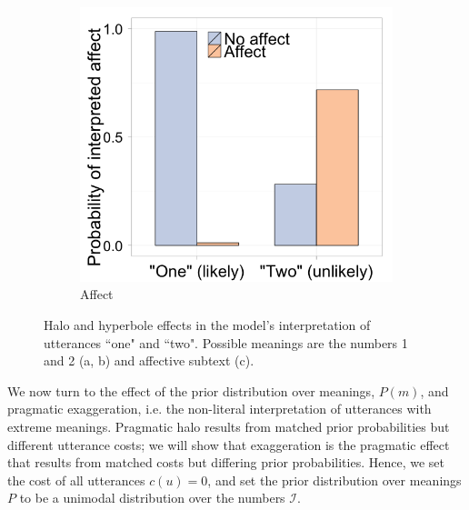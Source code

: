 \documentclass{article} %
\begin{document}
\begin{figure}[t]
\begin{subfigure}[t]{0.33\textwidth}
	\end{subfigure}
	\begin{subfigure}[t]{0.33\textwidth}
                \centering
                \caption{Affect}
                \includegraphics[width=\textwidth]{model_valence.png}
		
	\end{subfigure}
	\caption{Halo and hyperbole effects in the model's interpretation of utterances ``one" and ``two". Possible meanings are the numbers 1 and 2 (a, b) and affective subtext (c).}
	\label{fig:model}
\end{figure}

We now turn to the effect of the prior distribution over meanings, $P(m)$, and pragmatic exaggeration, i.e. the non-literal interpretation of utterances with extreme meanings. 
Pragmatic halo results from matched prior probabilities but different utterance costs; we will show that exaggeration is the pragmatic effect that results from matched costs but differing prior probabilities. 
Hence, we set the cost of all utterances $c(u)=0$, and set the prior distribution over meanings $P$ to be a unimodal distribution over the numbers $\mathcal I$. 
\end{document}
